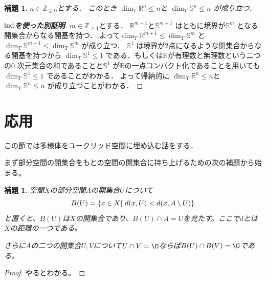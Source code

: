 \documentclass[leqno, a4paper, 12pt]{jsarticle}
\newtheorem{lem}[thm]{補題}
\newcommand{\zz}{\mathbb{Z}}
\newcommand{\rr}{\mathbb{R}}
\newcommand{\ind}{\text{{\rm ind}}}
\begin{document}
\begin{lem}\label{lem:nnn}
$n\in \zz_{\ge 0}$とする．
このとき
$\dim_{T}\rr^{n}\le n$と
$\dim_{T}\mathbb{S}^{n}\le n$
が成り立つ．
\end{lem}
\begin{proof}[\textbf{$\ind$を使った別証明}]
$m\in \zz_{\ge 1}$とする．
$\rr^{m+1}$と$\mathbb{S}^{m+1}$
はともに境界が$\mathbb{S}^{m}$
となる開集合からなる開基を持つ．
よって$\dim_{T}\rr^{m+1}\le \dim_{T}\mathbb{S}^{m}$
と
$\dim_{T}\mathbb{S}^{m+1}\le \dim_{T}\mathbb{S}^{m}$
が成り立つ．
$\mathbb{S}^{1}$
は境界が2点になるような開集合からなる開基を持つから
$\dim_{T}\mathbb{S}^{1}\le 1$
である．もしくは$\rr$が有理数と無理数という二つの$0$
次元集合の和であることと$\mathbb{S}^{1}$
が$\rr$の一点コンパクト化であることを用いても
$\dim_{T}\mathbb{S}^{1}\le 1$
であることがわかる．
よって帰納的に
$\dim_{T}\rr^{n}\le n$と
$\dim_{T}\mathbb{S}^{n}\le n$
が成り立つことがわかる．
\end{proof}

\section{応用}
この節では多様体をユークリッド空間に埋め込む話をする．

\par まず部分空間の開集合をもとの空間の開集合に持ち上げるための次の補題から始まる。

\begin{lem}\label{lem}
空間$X$の部分空間$A$の開集合$U$について
\[
B(U)=\{x\in X\\ |\ d(x,U)<d(x,A\setminus U)\}
\]
と置くと、$B(U)$は$X$の開集合であり、$B(U)\cap A=U$を充たす。ここで$d$とは$X$の距離の一つである。\par
さらに$A$の二つの開集合$U,V$について$U\cap V=\O$ならば$B(U)\cap B(V)=\O$である。
\end{lem}
\begin{proof}
やるとわかる。
\end{proof}
\end{document}
